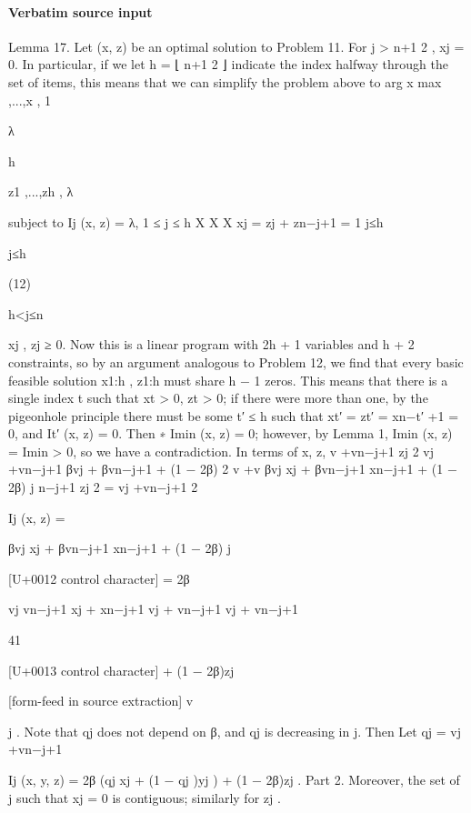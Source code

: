 \documentclass[10pt]{article}
\begin{document}
\paragraph{Verbatim source input}
\begin{ReviewVerbatim}
Lemma 17. Let (x, z) be an optimal solution to Problem 11. For j > n+1
2 , xj = 0.
In particular, if we let h = ⌊ n+1
2 ⌋ indicate the index halfway through the set of items, this means that
we can simplify the problem above to
arg x max
,...,x ,
1

λ

h

z1 ,...,zh ,
λ

subject to Ij (x, z) = λ, 1 ≤ j ≤ h
X
X
X
xj =
zj +
zn−j+1 = 1
j≤h

j≤h

(12)

h<j≤n

xj , zj ≥ 0.
Now this is a linear program with 2h + 1 variables and h + 2 constraints, so by an argument analogous
to Problem 12, we find that every basic feasible solution x1:h , z1:h must share h − 1 zeros. This means
that there is a single index t such that xt > 0, zt > 0; if there were more than one, by the pigeonhole
principle there must be some t′ ≤ h such that xt′ = zt′ = xn−t′ +1 = 0, and It′ (x, z) = 0. Then
∗
Imin (x, z) = 0; however, by Lemma 1, Imin (x, z) = Imin
> 0, so we have a contradiction.
In terms of x, z,
v +vn−j+1
zj
2
vj +vn−j+1
βvj + βvn−j+1 + (1 − 2β)
2
v +v
βvj xj + βvn−j+1 xn−j+1 + (1 − 2β) j n−j+1
zj
2
=
vj +vn−j+1
2

Ij (x, z) =

βvj xj + βvn−j+1 xn−j+1 + (1 − 2β) j

[U+0012 control character]
= 2β

vj
vn−j+1
xj +
xn−j+1
vj + vn−j+1
vj + vn−j+1

41

[U+0013 control character]
+ (1 − 2β)zj


[form-feed in source extraction]
v

j
. Note that qj does not depend on β, and qj is decreasing in j. Then
Let qj = vj +vn−j+1

Ij (x, y, z) = 2β (qj xj + (1 − qj )yj ) + (1 − 2β)zj .
Part 2. Moreover, the set of j such that xj = 0 is contiguous; similarly for zj .
\end{ReviewVerbatim}
\end{document}

